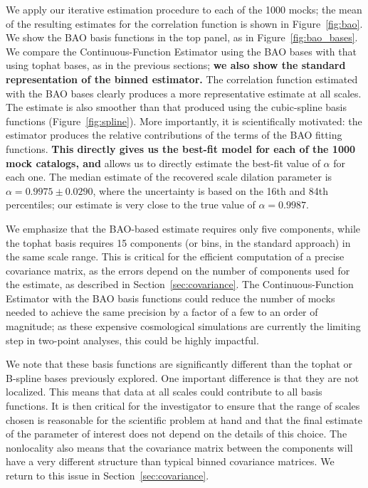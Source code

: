 \documentclass[modern]{aastex62}
\newcommand{\Est}{The Continuous-Function Estimator\xspace}
\newcommand{\est}{the Continuous-Function Estimator\xspace}
\newcommand{\new}[1]{\textbf{#1}}
\begin{document}
We apply our iterative estimation procedure to each of the 1000 mocks; the mean of the resulting estimates for the correlation function is shown in Figure~\ref{fig:bao}.
We show the BAO basis functions in the top panel, as in Figure~\ref{fig:bao_bases}.
We compare \est using the BAO bases with that using tophat bases, as in the previous sections; \new{we also show the standard representation of the binned estimator.}
The correlation function estimated with the BAO bases clearly produces a more representative estimate at all scales.
The estimate is also smoother than that produced using the cubic-spline basis functions (Figure~\ref{fig:spline}).
More importantly, it is scientifically motivated: the estimator produces the relative contributions of the terms of the BAO fitting functions.
\new{This directly gives us the best-fit model for each of the 1000 mock catalogs, and} allows us to directly estimate the best-fit value of $\alpha$ for each one.
The median estimate of the recovered scale dilation parameter is $\alpha=0.9975 \pm 0.0290$, where the uncertainty is based on the 16th and 84th percentiles; our estimate is very close to the true value of $\alpha = 0.9987$.

We emphasize that the BAO-based estimate requires only five components, while the tophat basis requires 15 components (or bins, in the standard approach) in the same scale range.
This is critical for the efficient computation of a precise covariance matrix, as the errors depend on the number of components used for the estimate, as described in Section~\ref{sec:covariance}.
\Est with the BAO basis functions could reduce the number of mocks needed to achieve the same precision by a factor of a few to an order of magnitude; as these expensive cosmological simulations are currently the limiting step in two-point analyses, this could be highly impactful.

We note that these basis functions are significantly different than the tophat or B-spline bases previously explored.
One important difference is that they are not localized.
This means that data at all scales could contribute to all basis functions.
It is then critical for the investigator to ensure that the range of scales chosen is reasonable for the scientific problem at hand and that the final estimate of the parameter of interest does not depend on the details of this choice.
The nonlocality also means that the covariance matrix between the components will have a very different structure than typical binned covariance matrices.
We return to this issue in Section~\ref{sec:covariance}.
\end{document}
